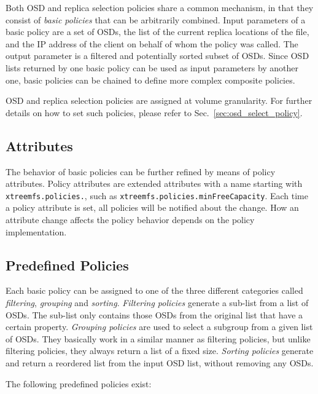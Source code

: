 \documentclass[a4paper,10pt]{book}
\begin{document}
Both OSD and replica selection policies share a common mechanism, in that they consist of \emph{basic policies} that can be arbitrarily combined. Input parameters of a basic policy are a set of OSDs, the list of the current replica locations of the file, and the IP address of the client on behalf of whom the policy was called. The output parameter is a filtered and potentially sorted subset of OSDs. Since OSD lists returned by one basic policy can be used as input parameters by another one, basic policies can be chained to define more complex composite policies.

OSD and replica selection policies are assigned at volume granularity. For further details on how to set such policies, please refer to Sec.\ \ref{sec:osd_select_policy}.

\subsection{Attributes}

The behavior of basic policies can be further refined by means of policy attributes. Policy attributes are extended attributes with a name starting with \texttt{xtreemfs.policies.}, such as \texttt{xtreemfs.policies.minFreeCapacity}. Each time a policy attribute is set, all policies will be notified about the change. How an attribute change affects the policy behavior depends on the policy implementation.

\subsection{Predefined Policies}

Each basic policy can be assigned to one of the three different categories called \emph{filtering}, \emph{grouping} and \emph{sorting}. \emph{Filtering policies} generate a sub-list from a list of OSDs. The sub-list only contains those OSDs from the original list that have a certain property. \emph{Grouping policies} are used to select a subgroup from a given list of OSDs. They basically work in a similar manner as filtering policies, but unlike filtering policies, they always return a list of a fixed size. \emph{Sorting policies} generate and return a reordered list from the input OSD list, without removing any OSDs.

The following predefined policies exist:
\end{document}

